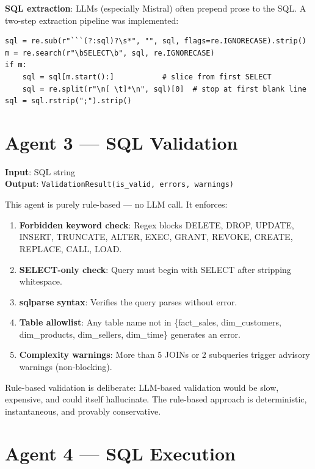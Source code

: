 \documentclass[12pt,a4paper]{report}
\begin{document}
\textbf{SQL extraction}: LLMs (especially Mistral) often prepend prose to the SQL. A
two-step extraction pipeline was implemented:

\begin{lstlisting}[caption={SQL extraction from LLM prose output}]
sql = re.sub(r"```(?:sql)?\s*", "", sql, flags=re.IGNORECASE).strip()
m = re.search(r"\bSELECT\b", sql, re.IGNORECASE)
if m:
    sql = sql[m.start():]           # slice from first SELECT
    sql = re.split(r"\n[ \t]*\n", sql)[0]  # stop at first blank line
sql = sql.rstrip(";").strip()
\end{lstlisting}

\section{Agent 3 — SQL Validation}

\textbf{Input}: SQL string\\
\textbf{Output}: \texttt{ValidationResult(is\_valid, errors, warnings)}

This agent is purely rule-based — no LLM call. It enforces:

\begin{enumerate}[leftmargin=*]
  \item \textbf{Forbidden keyword check}: Regex blocks DELETE, DROP, UPDATE, INSERT, TRUNCATE,
        ALTER, EXEC, GRANT, REVOKE, CREATE, REPLACE, CALL, LOAD.
  \item \textbf{SELECT-only check}: Query must begin with SELECT after stripping whitespace.
  \item \textbf{sqlparse syntax}: Verifies the query parses without error.
  \item \textbf{Table allowlist}: Any table name not in \{fact\_sales, dim\_customers,
        dim\_products, dim\_sellers, dim\_time\} generates an error.
  \item \textbf{Complexity warnings}: More than 5 JOINs or 2 subqueries trigger advisory
        warnings (non-blocking).
\end{enumerate}

Rule-based validation is deliberate: LLM-based validation would be slow, expensive, and could
itself hallucinate. The rule-based approach is deterministic, instantaneous, and provably
conservative.

\section{Agent 4 — SQL Execution}
\end{document}
